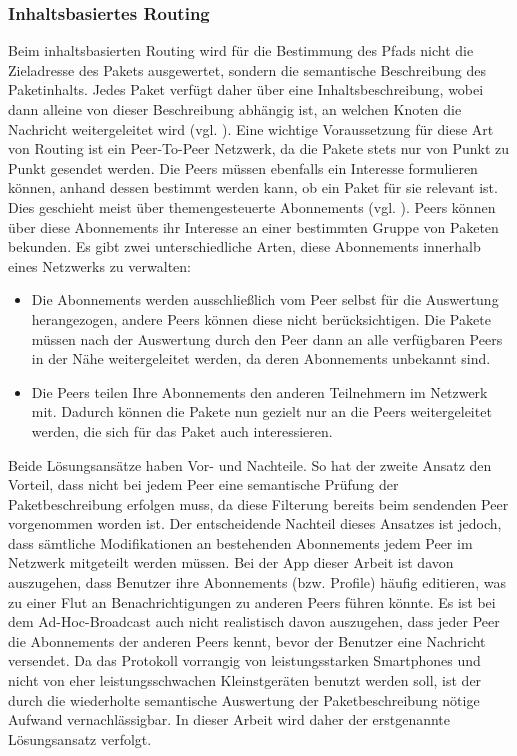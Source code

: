 \subsubsection{Inhaltsbasiertes Routing}
Beim inhaltsbasierten Routing wird für die Bestimmung des Pfads nicht die Zieladresse des Pakets ausgewertet, sondern die semantische Beschreibung des Paketinhalts. Jedes Paket verfügt daher über eine Inhaltsbeschreibung, wobei dann alleine von dieser Beschreibung abhängig ist, an welchen Knoten die Nachricht weitergeleitet wird (vgl. \citet[S. 649]{Tanenbaum2007}). Eine wichtige Voraussetzung für diese Art von Routing ist ein Peer-To-Peer Netzwerk, da die Pakete stets nur von Punkt zu Punkt gesendet werden. Die Peers müssen ebenfalls ein Interesse formulieren können, anhand dessen bestimmt werden kann, ob ein Paket für sie relevant ist. Dies geschieht meist über themengesteuerte Abonnements (vgl. \citet[S. 650f]{Tanenbaum2007}). Peers können über diese Abonnements ihr Interesse an einer bestimmten Gruppe von Paketen bekunden. Es gibt zwei unterschiedliche Arten, diese Abonnements innerhalb eines Netzwerks zu verwalten:
\begin{itemize}
	\item Die Abonnements werden ausschließlich vom Peer selbst für die Auswertung herangezogen, andere Peers können diese nicht berücksichtigen. Die Pakete müssen nach der Auswertung durch den Peer dann an alle verfügbaren Peers in der Nähe weitergeleitet werden, da deren Abonnements unbekannt sind. 
	\item Die Peers teilen Ihre Abonnements den anderen Teilnehmern im Netzwerk mit. Dadurch können die Pakete nun gezielt nur an die Peers weitergeleitet werden, die sich für das Paket auch interessieren.
\end{itemize}
Beide Lösungsansätze haben Vor- und Nachteile. So hat der zweite Ansatz den Vorteil, dass nicht bei jedem Peer eine semantische Prüfung der Paketbeschreibung erfolgen muss, da diese Filterung bereits beim sendenden Peer vorgenommen worden ist. Der entscheidende Nachteil dieses Ansatzes ist jedoch, dass sämtliche Modifikationen an bestehenden Abonnements jedem Peer im Netzwerk mitgeteilt werden müssen. Bei der App dieser Arbeit ist davon auszugehen, dass Benutzer ihre Abonnements (bzw. Profile) häufig editieren, was zu einer Flut an Benachrichtigungen zu anderen Peers führen könnte. Es ist bei dem Ad-Hoc-Broadcast auch nicht realistisch davon auszugehen, dass jeder Peer die Abonnements der anderen Peers kennt, bevor der Benutzer eine Nachricht versendet. Da das Protokoll vorrangig von leistungsstarken Smartphones und nicht von eher leistungsschwachen Kleinstgeräten benutzt werden soll, ist der durch die wiederholte semantische Auswertung der Paketbeschreibung nötige Aufwand vernachlässigbar. In dieser Arbeit wird daher der erstgenannte Lösungsansatz verfolgt. 
